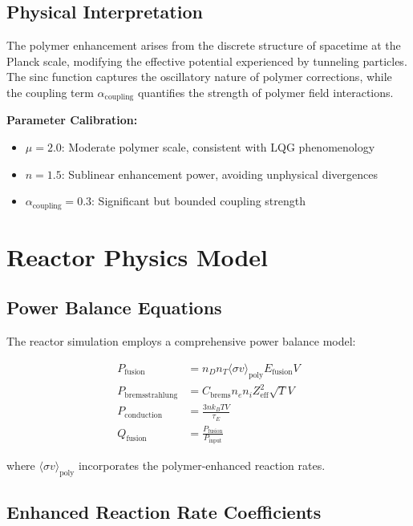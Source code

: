 \documentclass[12pt,a4paper]{article}
\begin{document}
\subsection{Physical Interpretation}

The polymer enhancement arises from the discrete structure of spacetime at the Planck scale, modifying the effective potential experienced by tunneling particles. The sinc function captures the oscillatory nature of polymer corrections, while the coupling term $\alpha_{\text{coupling}}$ quantifies the strength of polymer field interactions.

\textbf{Parameter Calibration:}
\begin{itemize}
    \item $\mu = 2.0$: Moderate polymer scale, consistent with LQG phenomenology
    \item $n = 1.5$: Sublinear enhancement power, avoiding unphysical divergences  
    \item $\alpha_{\text{coupling}} = 0.3$: Significant but bounded coupling strength
\end{itemize}

\section{Reactor Physics Model}

\subsection{Power Balance Equations}

The reactor simulation employs a comprehensive power balance model:

\begin{align}
P_{\text{fusion}} &= n_D n_T \langle\sigma v\rangle_{\text{poly}} E_{\text{fusion}} V \\
P_{\text{bremsstrahlung}} &= C_{\text{brems}} n_e n_i Z_{\text{eff}}^2 \sqrt{T} V \\
P_{\text{conduction}} &= \frac{3 n k_B T V}{\tau_E} \\
Q_{\text{fusion}} &= \frac{P_{\text{fusion}}}{P_{\text{input}}}
\end{align}

where $\langle\sigma v\rangle_{\text{poly}}$ incorporates the polymer-enhanced reaction rates.

\subsection{Enhanced Reaction Rate Coefficients}
\end{document}
